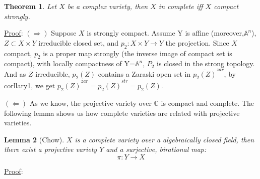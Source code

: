 \documentclass[a4paper]{article}
\newtheorem{thm}{Theorem}
\newtheorem{lemma}[thm]{Lemma}
\theoremstyle{definition}
\theoremstyle{remark}
\begin{document}
\begin{thm} Let $X$ be a complex variety, then $X$ in complete iff $X$ compact strongly.
\end{thm}
\begin{spacing}{1.1}
  \noindent\underline{Proof}: $(\Longrightarrow)$ Suppose $X$ is strongly compact. Assume Y is affine (moreover,$\mathbb{A}^n$), $Z\subset X\times Y$ irreducible closed set, and $p_2:X\times Y \rightarrow Y$ the projection. Since $X$ compact, $p_2$ is a proper map strongly (the inverse image of compact set is compact), with locally compactness of Y=$\mathbb{A}^n$, $P_2$ is closed in the strong topology. And as $Z$ irreducible, $p_2(Z)$ contains a Zaraski open set in $\overline{p_2(Z)}^{zar}$, by corllary1, we get $\overline{p_2(Z)}^{zar}=\overline{p_2(Z)}^{str}=p_2(Z)$.
\end{spacing}
$(\Longleftarrow)$ As we know, the projective variety over $\mathbb C$ is compact and complete. The following lemma shows us how complete varieties are related with projective varieties.
\begin{lemma}[Chow] $X$ is a complete variety over a algebraically closed field, then there exist a projective variety $Y$ and a surjective, birational map:  $$\pi:Y \rightarrow X $$
\end{lemma}
  \noindent\underline{Proof}:
\end{document}
